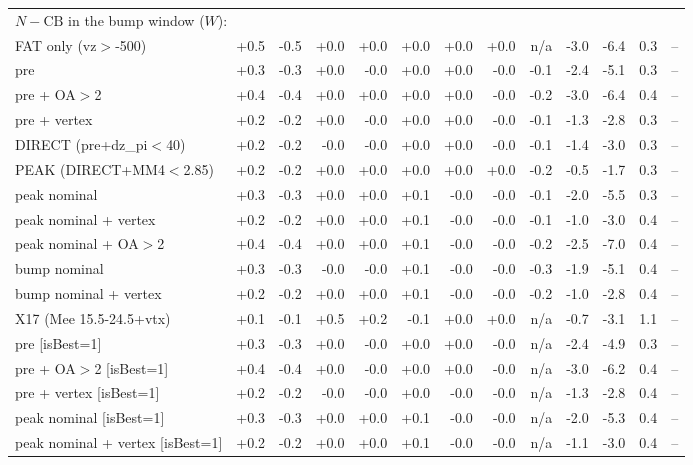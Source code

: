 \begin{table}[H]
{\begin{tabular}{lrrrrrrrrrrrr}
\midrule
\multicolumn{13}{l}{$N-\text{CB}$ in the bump window ($W$):}\\
FAT only (vz$>$-500) & +0.5 & -0.5 & +0.0 & +0.0 & +0.0 & +0.0 & +0.0 & n/a & -3.0 & -6.4 & 0.3 & --\\
pre & +0.3 & -0.3 & +0.0 & -0.0 & +0.0 & +0.0 & -0.0 & -0.1 & -2.4 & -5.1 & 0.3 & --\\
pre + OA$>$2 & +0.4 & -0.4 & +0.0 & +0.0 & +0.0 & +0.0 & -0.0 & -0.2 & -3.0 & -6.4 & 0.4 & --\\
pre + vertex & +0.2 & -0.2 & +0.0 & -0.0 & +0.0 & +0.0 & -0.0 & -0.1 & -1.3 & -2.8 & 0.3 & --\\
DIRECT (pre+dz\_pi$<$40) & +0.2 & -0.2 & -0.0 & -0.0 & +0.0 & +0.0 & -0.0 & -0.1 & -1.4 & -3.0 & 0.3 & --\\
PEAK (DIRECT+MM4$<$2.85) & +0.2 & -0.2 & +0.0 & +0.0 & +0.0 & +0.0 & +0.0 & -0.2 & -0.5 & -1.7 & 0.3 & --\\
peak nominal & +0.3 & -0.3 & +0.0 & +0.0 & +0.1 & -0.0 & -0.0 & -0.1 & -2.0 & -5.5 & 0.3 & --\\
peak nominal + vertex & +0.2 & -0.2 & +0.0 & +0.0 & +0.1 & -0.0 & -0.0 & -0.1 & -1.0 & -3.0 & 0.4 & --\\
peak nominal + OA$>$2 & +0.4 & -0.4 & +0.0 & +0.0 & +0.1 & -0.0 & -0.0 & -0.2 & -2.5 & -7.0 & 0.4 & --\\
bump nominal & +0.3 & -0.3 & -0.0 & -0.0 & +0.1 & -0.0 & -0.0 & -0.3 & -1.9 & -5.1 & 0.4 & --\\
bump nominal + vertex & +0.2 & -0.2 & +0.0 & +0.0 & +0.1 & -0.0 & -0.0 & -0.2 & -1.0 & -2.8 & 0.4 & --\\
X17 (Mee 15.5-24.5+vtx) & +0.1 & -0.1 & +0.5 & +0.2 & -0.1 & +0.0 & +0.0 & n/a & -0.7 & -3.1 & 1.1 & --\\
pre [isBest=1] & +0.3 & -0.3 & +0.0 & -0.0 & +0.0 & +0.0 & -0.0 & n/a & -2.4 & -4.9 & 0.3 & --\\
pre + OA$>$2 [isBest=1] & +0.4 & -0.4 & +0.0 & -0.0 & +0.0 & +0.0 & -0.0 & n/a & -3.0 & -6.2 & 0.4 & --\\
pre + vertex [isBest=1] & +0.2 & -0.2 & -0.0 & -0.0 & +0.0 & -0.0 & -0.0 & n/a & -1.3 & -2.8 & 0.4 & --\\
peak nominal [isBest=1] & +0.3 & -0.3 & +0.0 & +0.0 & +0.1 & -0.0 & -0.0 & n/a & -2.0 & -5.3 & 0.4 & --\\
peak nominal + vertex [isBest=1] & +0.2 & -0.2 & +0.0 & +0.0 & +0.1 & -0.0 & -0.0 & n/a & -1.1 & -3.0 & 0.4 & --\\
\bottomrule
\end{tabular}}
\end{table}
